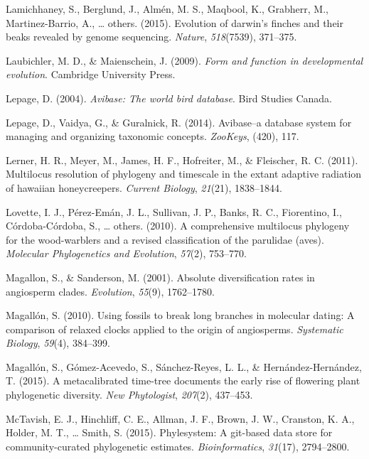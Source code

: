 \documentclass[english,man]{apa6}
\begin{document}
\leavevmode\hypertarget{ref-lamichhaney2015evolution}{}%
Lamichhaney, S., Berglund, J., Almén, M. S., Maqbool, K., Grabherr, M., Martinez-Barrio, A., \ldots{} others. (2015). Evolution of darwin's finches and their beaks revealed by genome sequencing. \emph{Nature}, \emph{518}(7539), 371--375.

\leavevmode\hypertarget{ref-laubichler2009form}{}%
Laubichler, M. D., \& Maienschein, J. (2009). \emph{Form and function in developmental evolution}. Cambridge University Press.

\leavevmode\hypertarget{ref-lepage2004avibase}{}%
Lepage, D. (2004). \emph{Avibase: The world bird database}. Bird Studies Canada.

\leavevmode\hypertarget{ref-lepage2014avibase}{}%
Lepage, D., Vaidya, G., \& Guralnick, R. (2014). Avibase--a database system for managing and organizing taxonomic concepts. \emph{ZooKeys}, (420), 117.

\leavevmode\hypertarget{ref-lerner2011multilocus}{}%
Lerner, H. R., Meyer, M., James, H. F., Hofreiter, M., \& Fleischer, R. C. (2011). Multilocus resolution of phylogeny and timescale in the extant adaptive radiation of hawaiian honeycreepers. \emph{Current Biology}, \emph{21}(21), 1838--1844.

\leavevmode\hypertarget{ref-lovette2010comprehensive}{}%
Lovette, I. J., Pérez-Emán, J. L., Sullivan, J. P., Banks, R. C., Fiorentino, I., Córdoba-Córdoba, S., \ldots{} others. (2010). A comprehensive multilocus phylogeny for the wood-warblers and a revised classification of the parulidae (aves). \emph{Molecular Phylogenetics and Evolution}, \emph{57}(2), 753--770.

\leavevmode\hypertarget{ref-magallon2001absolute}{}%
Magallon, S., \& Sanderson, M. (2001). Absolute diversification rates in angiosperm clades. \emph{Evolution}, \emph{55}(9), 1762--1780.

\leavevmode\hypertarget{ref-magallon2010using}{}%
Magallón, S. (2010). Using fossils to break long branches in molecular dating: A comparison of relaxed clocks applied to the origin of angiosperms. \emph{Systematic Biology}, \emph{59}(4), 384--399.

\leavevmode\hypertarget{ref-magallon2015metacalibrated}{}%
Magallón, S., Gómez-Acevedo, S., Sánchez-Reyes, L. L., \& Hernández-Hernández, T. (2015). A metacalibrated time-tree documents the early rise of flowering plant phylogenetic diversity. \emph{New Phytologist}, \emph{207}(2), 437--453.

\leavevmode\hypertarget{ref-mctavish2015phylesystem}{}%
McTavish, E. J., Hinchliff, C. E., Allman, J. F., Brown, J. W., Cranston, K. A., Holder, M. T., \ldots{} Smith, S. (2015). Phylesystem: A git-based data store for community-curated phylogenetic estimates. \emph{Bioinformatics}, \emph{31}(17), 2794--2800.
\end{document}
